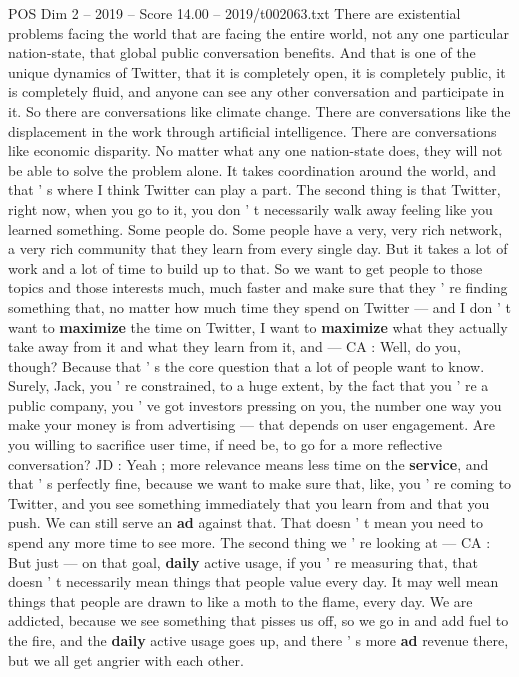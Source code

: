 \begin{textsample}{POS Dim 2 – 2019 – Score 14.00 – 2019/t002063.txt}
There are existential problems facing the world that are facing the entire world, not any one particular nation-state, that global public conversation benefits.
And that is one of the unique dynamics of Twitter, that it is completely open, it is completely public, it is completely fluid, and anyone can see any other conversation and participate in it.
So there are conversations like climate change.
There are conversations like the displacement in the work through artificial intelligence.
There are conversations like economic disparity.
No matter what any one nation-state does, they will not be able to solve the problem alone.
It takes coordination around the world, and that ' s where I think Twitter can play a part.
The second thing is that Twitter, right now, when you go to it, you don ' t necessarily walk away feeling like you learned something.
Some people do.
Some people have a very, very rich network, a very rich community that they learn from every single day.
But it takes a lot of work and a lot of time to build up to that.
So we want to get people to those topics and those interests much, much faster and make sure that they ' re finding something that, no matter how much time they spend on Twitter — and I don ' t want to \textbf{maximize} the time on Twitter, I want to \textbf{maximize} what they actually take away from it and what they learn from it, and — CA : Well, do you, though?
Because that ' s the core question that a lot of people want to know.
Surely, Jack, you ' re constrained, to a huge extent, by the fact that you ' re a public company, you ' ve got investors pressing on you, the number one way you make your money is from advertising — that depends on user engagement.
Are you willing to sacrifice user time, if need be, to go for a more reflective conversation?
JD : Yeah ; more relevance means less time on the \textbf{service}, and that ' s perfectly fine, because we want to make sure that, like, you ' re coming to Twitter, and you see something immediately that you learn from and that you push.
We can still serve an \textbf{ad} against that.
That doesn ' t mean you need to spend any more time to see more.
The second thing we ' re looking at — CA : But just — on that goal, \textbf{daily} active usage, if you ' re measuring that, that doesn ' t necessarily mean things that people value every day.
It may well mean things that people are drawn to like a moth to the flame, every day.
We are addicted, because we see something that pisses us off, so we go in and add fuel to the fire, and the \textbf{daily} active usage goes up, and there ' s more \textbf{ad} revenue there, but we all get angrier with each other.

\end{textsample}
